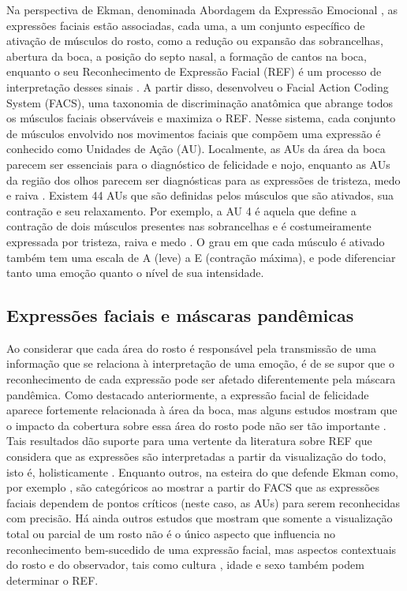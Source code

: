 \documentclass[portuguese]{textolivre}
\begin{document}
Na perspectiva de Ekman, denominada Abordagem da Expressão Emocional \cite{sousa_emocoes_2010}, as expressões faciais estão associadas, cada uma, a um conjunto específico de ativação de músculos do rosto, como a redução ou expansão das sobrancelhas, abertura da boca, a posição do septo nasal, a formação de cantos na boca, enquanto o seu Reconhecimento de Expressão Facial (REF) é um processo de interpretação desses sinais \cite{du_compound_2014, smith_transmitting_2005, tejada_building_2022}. A partir disso, \textcite{ekman_facial_2002} desenvolveu o Facial Action Coding System (FACS), uma taxonomia de discriminação anatômica que abrange todos os músculos faciais observáveis e maximiza o REF. Nesse sistema, cada conjunto de músculos envolvido nos movimentos faciais que compõem uma expressão é conhecido como Unidades de Ação (AU). Localmente, as AUs da área da boca parecem ser essenciais para o diagnóstico de felicidade e nojo, enquanto as AUs da região dos olhos parecem ser diagnósticas para as expressões de tristeza, medo e raiva \cite{donato_classifying_1999, du_compound_2014, tejada_building_2022}. Existem 44 AUs que são definidas pelos músculos que são ativados, sua contração e seu relaxamento. Por exemplo, a AU 4 é aquela que define a contração de dois músculos presentes nas sobrancelhas e é costumeiramente expressada por tristeza, raiva e medo \cite{donato_classifying_1999, ekman_facial_2002, ekman_pictures_1976}. O grau em que cada músculo é ativado também tem uma escala de A (leve) a E (contração máxima), e pode diferenciar tanto uma emoção quanto o nível de sua intensidade. 


\subsection{Expressões faciais e máscaras pandêmicas}\label{sec-fmt-manuscrito}

Ao considerar que cada área do rosto é responsável pela transmissão de uma informação que se relaciona à interpretação de uma emoção, é de se supor que o reconhecimento de cada expressão pode ser afetado diferentemente pela máscara pandêmica. Como destacado anteriormente, a expressão facial de felicidade aparece fortemente relacionada à área da boca, mas alguns estudos mostram que o impacto da cobertura sobre essa área do rosto pode não ser tão importante \cite{calvo_facial_2008,calvo_facial_2014}. Tais resultados dão suporte para uma vertente da literatura sobre REF que considera que as expressões são interpretadas a partir da visualização do todo, isto é, holisticamente \cite{freud_covid-19_2020, kovacs_face_2017}. Enquanto outros, na esteira do que defende Ekman como, por exemplo \textcite{wegrzyn_mapping_2017}, são categóricos ao mostrar a partir do FACS que as expressões faciais dependem de pontos críticos (neste caso, as AUs) para serem reconhecidas com precisão. Há ainda outros estudos que mostram que somente a visualização total ou parcial de um rosto não é o único aspecto que influencia no reconhecimento bem-sucedido de uma expressão facial, mas aspectos contextuais do rosto e do observador, tais como cultura \cite{kret_recognition_2018}, idade e sexo \cite{cortez_o_2021} também podem determinar o REF. 
\end{document}
